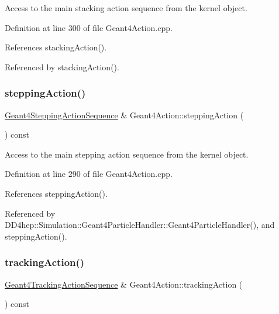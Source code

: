 Access to the main stacking action sequence from the kernel object. 



Definition at line 300 of file Geant4\+Action.\+cpp.



References stacking\+Action().



Referenced by stacking\+Action().

\hypertarget{class_d_d4hep_1_1_simulation_1_1_geant4_action_a2dd6a5716aedfdab406510a4239b0c5a}{}\label{class_d_d4hep_1_1_simulation_1_1_geant4_action_a2dd6a5716aedfdab406510a4239b0c5a} 
\subsubsection{\texorpdfstring{stepping\+Action()}{steppingAction()}}
{\footnotesize\ttfamily \hyperlink{class_d_d4hep_1_1_simulation_1_1_geant4_stepping_action_sequence}{Geant4\+Stepping\+Action\+Sequence} \& Geant4\+Action\+::stepping\+Action (\begin{DoxyParamCaption}{ }\end{DoxyParamCaption}) const}



Access to the main stepping action sequence from the kernel object. 



Definition at line 290 of file Geant4\+Action.\+cpp.



References stepping\+Action().



Referenced by D\+D4hep\+::\+Simulation\+::\+Geant4\+Particle\+Handler\+::\+Geant4\+Particle\+Handler(), and stepping\+Action().

\hypertarget{class_d_d4hep_1_1_simulation_1_1_geant4_action_a42e67d0f379567b039b4249bd650a30b}{}\label{class_d_d4hep_1_1_simulation_1_1_geant4_action_a42e67d0f379567b039b4249bd650a30b} 
\subsubsection{\texorpdfstring{tracking\+Action()}{trackingAction()}}
{\footnotesize\ttfamily \hyperlink{class_d_d4hep_1_1_simulation_1_1_geant4_tracking_action_sequence}{Geant4\+Tracking\+Action\+Sequence} \& Geant4\+Action\+::tracking\+Action (\begin{DoxyParamCaption}{ }\end{DoxyParamCaption}) const}



